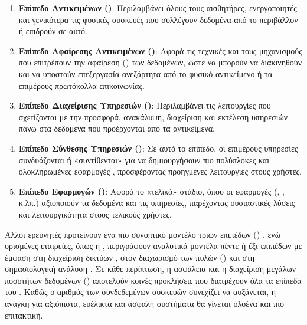 \begin{enumerate}
    \item \textbf{Επίπεδο Αντικειμένων ()}: Περιλαμβάνει όλους τους αισθητήρες,
    ενεργοποιητές και γενικότερα τις φυσικές  συσκευές που συλλέγουν δεδομένα από το
    περιβάλλον ή επιδρούν σε αυτό.

    \item \textbf{Επίπεδο Αφαίρεσης Αντικειμένων ()}: Αφορά τις τεχνικές
    και τους μηχανισμούς που επιτρέπουν την αφαίρεση () των δεδομένων, ώστε
    να μπορούν να διακινηθούν και να υποστούν επεξεργασία ανεξάρτητα από το φυσικό αντικείμενο
    ή τα επιμέρους πρωτόκολλα επικοινωνίας.

    \item \textbf{Επίπεδο Διαχείρισης Υπηρεσιών ()}: Περιλαμβάνει τις
    λειτουργίες που σχετίζονται με την προσφορά, ανακάλυψη, διαχείριση και εκτέλεση υπηρεσιών
    πάνω στα δεδομένα που προέρχονται από τα αντικείμενα.

    \item \textbf{Επίπεδο Σύνθεσης Υπηρεσιών ()}: Σε αυτό το επίπεδο,
    οι επιμέρους υπηρεσίες συνδυάζονται ή «συντίθενται» για να δημιουργήσουν πιο πολύπλοκες
    και ολοκληρωμένες εφαρμογές , προσφέροντας προηγμένες λειτουργίες στους χρήστες.

    \item \textbf{Επίπεδο Εφαρμογών ()}: Αφορά το «τελικό» στάδιο, όπου οι
    εφαρμογές (, ,  κ.λπ.) αξιοποιούν τα δεδομένα
    και τις υπηρεσίες, παρέχοντας ουσιαστικές λύσεις και λειτουργικότητα στους τελικούς χρήστες.
\end{enumerate}

Άλλοι ερευνητές προτείνουν ένα πιο συνοπτικό μοντέλο τριών επιπέδων () \cite{gubbi_internet_2013}, ενώ ορισμένες εταιρείες, όπως η , περιγράφουν
αναλυτικά μοντέλα πέντε ή έξι επιπέδων με έμφαση στη διαχείριση δικτύων , στον
διαχωρισμό των πυλών () και στη σημασιολογική ανάλυση \cite{Cisco2014}. Σε κάθε
περίπτωση, η ασφάλεια και η διαχείριση μεγάλων ποσοτήτων δεδομένων () αποτελούν
κοινές προκλήσεις που διατρέχουν όλα τα επίπεδα του . Καθώς ο αριθμός των
συνδεδεμένων συσκευών συνεχίζει να αυξάνεται, η ανάγκη για αξιόπιστα, ευέλικτα και ασφαλή
συστήματα θα γίνεται ολοένα και πιο επιτακτική.


